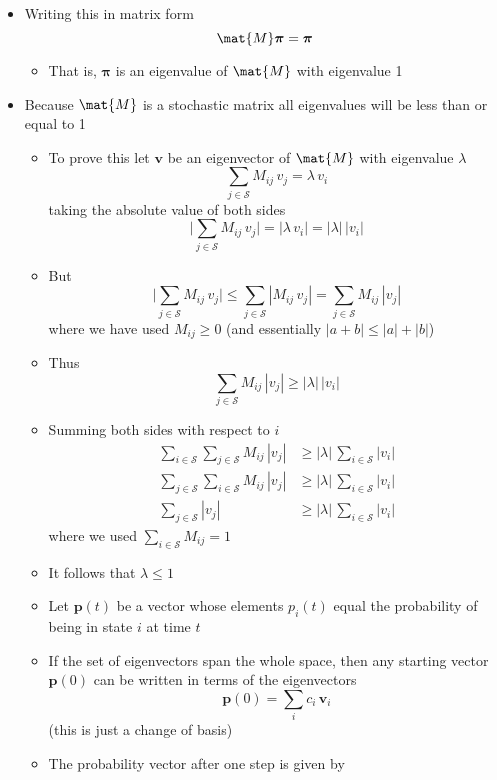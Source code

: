 \documentclass[11pt]{article}
\begin{document}
\begin{itemize}
\begin{itemize}
\begin{itemize}
\end{itemize}
\item Writing this in matrix form
$$ \mat{M} \bm{\pi} = \bm{\pi} $$
\begin{itemize}
\item That is, \(\bm{\pi}\) is an eigenvalue of \(\mat{M}\) with
eigenvalue 1
\end{itemize}
\item Because \(\mat{M}\) is a stochastic matrix all eigenvalues will
be less than or equal to 1
\begin{itemize}
\item To prove this let \(\bm{v}\) be an eigenvector of \(\mat{M}\)
with eigenvalue \(\lambda\)
$$  \sum_{j\in\mathcal{S}} M_{ij} \, v_{j} = \lambda \, v_{i} $$
taking the absolute value of both sides
$$ \biggl| \sum_{j\in\mathcal{S}} M_{ij} \, v_{j} \biggr|
         = |\lambda\, v_{i}| = |\lambda| \, |v_{i}| $$
\item But
$$ \biggl| \sum_{j\in\mathcal{S}} M_{ij} \, v_{j} \biggr|
	 \leq \sum_{j\in\mathcal{S}}\left| M_{ij} \, v_{j} \right|
	 = \sum_{j\in\mathcal{S}} M_{ij} \, |v_{j}| $$
where we have used \(M_{ij}\geq0\) (and essentially \(|a + b| \leq |a| + |b|\))
\item Thus
$$ \sum_{j\in\mathcal{S}} M_{ij} \, |v_{j}|  \geq |\lambda|
         \, |v_{i}| $$
\item Summing both sides with respect to \(i\)
\begin{align*}
\sum_{i\in\mathcal{S}} \sum_{j\in\mathcal{S}}
M_{ij}\, |v_{j}|  &\geq |\lambda| \,
\sum_{i\in\mathcal{S}} |v_{i}|  \\
\sum_{j\in\mathcal{S}} \sum_{i\in\mathcal{S}}
M_{ij}\, |v_{j}|  &\geq |\lambda| \,
\sum_{i\in\mathcal{S}} |v_{i}|  \\
\sum_{j\in\mathcal{S}}  |v_{j}| &\geq |\lambda| \,
\sum_{i\in\mathcal{S}} |v_{i}| 
\end{align*}
where we used \(\sum_{i\in\mathcal{S}}M_{ij} = 1\)
\item It follows that \(\lambda\leq 1\)
\item Let \(\bm{p}(t)\) be a vector whose elements \(p_{i}(t)\)
equal the probability of being in state \(i\) at time \(t\)
\item If the set of eigenvectors span the whole space, then any
starting vector \(\bm{p}(0)\) can be written in terms of the
eigenvectors 
$$ \bm{p}(0) = \sum_{i} c_{i}\,\bm{v}_{i} $$
(this is just a change of basis)
\item The probability vector after one step is given by

\end{itemize}
\end{itemize}
\end{itemize}
\end{document}
